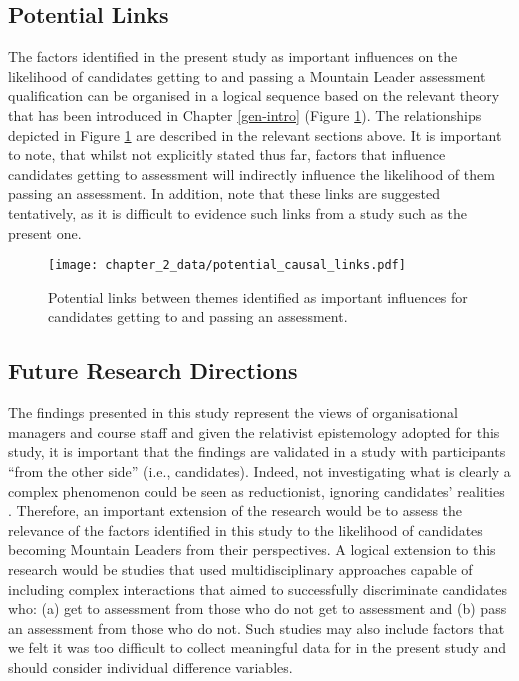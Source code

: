 \documentclass[
  12pt,
  a4paper,
]{book}
\begin{document}
\hypertarget{potential-links}{%
\subsection{Potential Links}\label{potential-links}}

The factors identified in the present study as important influences on the likelihood of candidates getting to and passing a Mountain Leader assessment qualification can be organised in a logical sequence based on the relevant theory that has been introduced in Chapter \ref{gen-intro} (Figure \ref{fig:qual-causal-links-fig}). The relationships depicted in Figure \ref{fig:qual-causal-links-fig} are described in the relevant sections above. It is important to note, that whilst not explicitly stated thus far, factors that influence candidates getting to assessment will indirectly influence the likelihood of them passing an assessment. In addition, note that these links are suggested tentatively, as it is difficult to evidence such links from a study such as the present one.

\begin{figure}[h]
  \centering
  \texttt{[image: chapter\_2\_data/potential\_causal\_links.pdf]}
  \caption{Potential links between themes identified as important influences for candidates getting to and passing an assessment.}
  \label{fig:qual-causal-links-fig}
\end{figure}

\hypertarget{qual-future-directions}{%
\subsection{Future Research Directions}\label{qual-future-directions}}

The findings presented in this study represent the views of organisational managers and course staff and given the relativist epistemology adopted for this study, it is important that the findings are validated in a study with participants ``from the other side'' (i.e., candidates). Indeed, not investigating what is clearly a complex phenomenon could be seen as reductionist, ignoring candidates' realities \citep{Smith2008}. Therefore, an important extension of the research would be to assess the relevance of the factors identified in this study to the likelihood of candidates becoming Mountain Leaders from their perspectives. A logical extension to this research would be studies that used multidisciplinary approaches capable of including complex interactions that aimed to successfully discriminate candidates who: (a) get to assessment from those who do not get to assessment and (b) pass an assessment from those who do not. Such studies may also include factors that we felt it was too difficult to collect meaningful data for in the present study and should consider individual difference variables.
\end{document}
